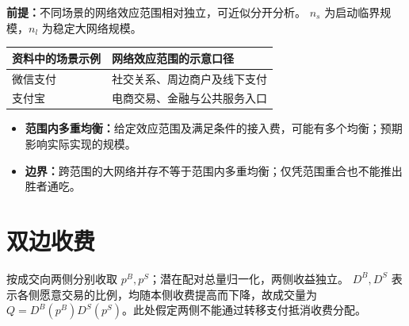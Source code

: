 \label{kp:scene-networks}
\textbf{前提：}不同场景的网络效应范围相对独立，可近似分开分析。
$n_s$ 为启动临界规模，$n_l$ 为稳定大网络规模。
{\setlength{\topsep}{2pt}
\begin{center}
\end{center}
}
\begin{center}
{\small
\begin{tabular}{ll}
\toprule
资料中的场景示例 & 网络效应范围的示意口径\\
\midrule
微信支付 & 社交关系、周边商户及线下支付\\
支付宝 & 电商交易、金融与公共服务入口\\
\bottomrule
\end{tabular}}
\end{center}
\begin{itemize}
\item \textbf{范围内多重均衡：}给定效应范围及满足条件的接入费，可能有多个均衡；预期影响实际实现的规模。
\item \textbf{边界：}跨范围的大网络并存不等于范围内多重均衡；仅凭范围重合也不能推出胜者通吃。
\end{itemize}

\section{双边收费}

按成交向两侧分别收取 $p^B,p^S$；潜在配对总量归一化，两侧收益独立。
$D^B,D^S$ 表示各侧愿意交易的比例，均随本侧收费提高而下降，故成交量为 $Q=D^B(p^B)D^S(p^S)$。此处假定两侧不能通过转移支付抵消收费分配。

